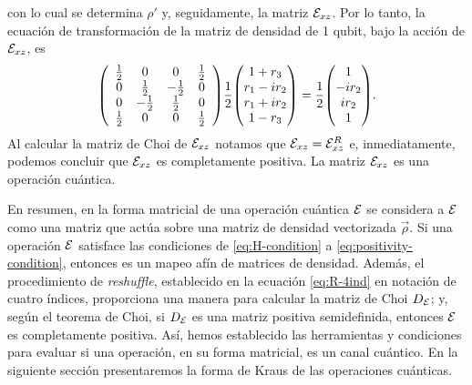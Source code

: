 con lo cual se determina $\rho'$ y, seguidamente,
la matriz $\mathcal{E}_{xz}$.
Por lo tanto, la ecuación de transformación de la matriz 
de densidad de 1 qubit, bajo la acción de $\mathcal{E}_{xz}$, es
\begin{align}
\mqty(
\begin{array}{cccc}
\frac{1}{2} & 0 & 0 & \frac{1}{2} \\
0 & \frac{1}{2} & -\frac{1}{2} & 0 \\
0 & -\frac{1}{2} & \frac{1}{2} & 0 \\
\frac{1}{2} & 0 & 0 & \frac{1}{2} \\
\end{array}
)
\frac{1}{2}
\mqty(
1+r_3\\r_1-ir_2\\r_1+ir_2\\1-r_3
)
=
\frac{1}{2}
\mqty(
1\\-ir_2\\ir_2\\1
).
\label{eq:QC-ex2-SR}
\end{align}
Al calcular la matriz de Choi de $\mathcal{E}_{xz}$ notamos 
que $\mathcal{E}_{xz}=\mathcal{E}_{xz}^R$ e, inmediatamente, podemos concluir
que $\mathcal{E}_{xz}$ es completamente positiva. La matriz $\mathcal{E}_{xz}$
es una operación cuántica.

En resumen, en la forma matricial de una operación cuántica $\mathcal{E}$
se considera a $\mathcal{E}$ como una matriz que actúa sobre 
una matriz de densidad vectorizada $\vec{\rho}$. 
Si una operación $\mathcal{E}$ satisface las condiciones de
\eqref{eq:H-condition} a \eqref{eq:positivity-condition}, entonces
es un mapeo afín de matrices de densidad.
Además, el procedimiento de \textit{reshuffle},
establecido en la ecuación \eqref{eq:R-4ind} en notación
de cuatro índices, proporciona una manera para 
calcular la matriz de Choi $D_{\mathcal{E}}$;
y, según el teorema de Choi, si 
$D_{\mathcal{E}}$ es una matriz positiva semidefinida, entonces $\mathcal{E}$ es 
completamente positiva. 
Así, hemos establecido las herramientas y condiciones para evaluar 
si una operación, en su forma matricial, es un canal cuántico.
En la siguiente sección presentaremos la forma de Kraus de las operaciones
cuánticas.

